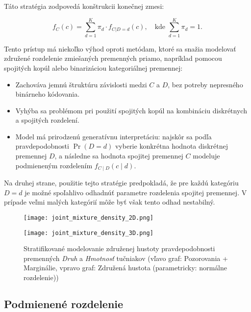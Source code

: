 Táto stratégia zodpovedá konštrukcii konečnej zmesi:

\begin{equation}
f_C(c) = \sum_{d=1}^{K} \pi_d \cdot f_{C|D=d}(c), \quad \text{kde } \sum_{d=1}^{K} \pi_d = 1.
\end{equation}

Tento prístup má niekoľko výhod oproti metódam, ktoré sa snažia modelovať združené rozdelenie zmiešaných premenných priamo, napríklad pomocou spojitých kopúl alebo binarizáciou kategoriálnej premennej:
\begin{itemize}
  \item Zachováva jemnú štruktúru závislosti medzi $C$ a $D$, bez potreby nepresného binárneho kódovania.
  \item Vyhýba sa problémom pri použití spojitých kopúl na kombináciu diskrétnych a spojitých rozdelení.
  \item Model má prirodzenú generatívnu interpretáciu: najskôr sa podľa pravdepodobnosti $\Pr(D = d)$ vyberie konkrétna hodnota diskrétnej premennej $D$, a následne sa hodnota spojitej premennej $C$ modeluje podmieneným rozdelením $f_{C \mid D}(c \mid d)$. 
\end{itemize}

Na druhej strane, použitie tejto stratégie predpokladá, že pre každú kategóriu $D = d$ je možné spoľahlivo odhadnúť parametre rozdelenia spojitej premennej. V prípade veľmi malých kategórií môže byť však tento odhad nestabilný.

\bigskip

\begin{figure}[H]
    \centering
    \begin{minipage}[t]{0.48\linewidth}
        \centering
        \texttt{[image: joint\_mixture\_density\_2D.png]}
    \end{minipage}
    \hfill
    \begin{minipage}[t]{0.48\linewidth}
        \centering
        \texttt{[image: joint\_mixture\_density\_3D.png]}
    \end{minipage}
    \caption{Stratifikované modelovanie združenej hustoty pravdepodobnosti premenných \textit{Druh} a \textit{Hmotnosť} tučniakov (vľavo graf: Pozorovania + Marginálie, vpravo graf: Združená hustota (parametricky: normálne rozdelenie))}
    \label{fig:stratified_modelling_mix_density}
\end{figure}


\subsection{Podmienené rozdelenie}


